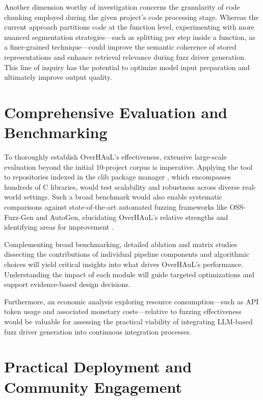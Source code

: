 \documentclass[
  a4paper,
]{scrreprt}
\theoremstyle{definition}
\theoremstyle{remark}
\begin{document}
Another dimension worthy of investigation concerns the granularity of
code chunking employed during the given project's code processing stage.
Whereas the current approach partitions code at the function level,
experimenting with more nuanced segmentation strategies---such as
splitting per step inside a function, as a finer-grained
technique---could improve the semantic coherence of stored
representations and enhance retrieval relevance during fuzz driver
generation. This line of inquiry has the potential to optimize model
input preparation and ultimately improve output quality.

\section{Comprehensive Evaluation and
Benchmarking}\label{comprehensive-evaluation-and-benchmarking}

To thoroughly establish OverHAuL's effectiveness, extensive large-scale
evaluation beyond the initial 10-project corpus is imperative. Applying
the tool to repositories indexed in the clib package manager
\autocite{clibs}, which encompasses hundreds of C libraries, would test
scalability and robustness across diverse real-world settings. Such a
broad benchmark would also enable systematic comparisons against
state-of-the-art automated fuzzing frameworks like OSS-Fuzz-Gen and
AutoGen, elucidating OverHAuL's relative strengths and identifying areas
for improvement \autocite{oss-fuzz-gen,sun2024}.

Complementing broad benchmarking, detailed ablation and matrix studies
dissecting the contributions of individual pipeline components and
algorithmic choices will yield critical insights into what drives
OverHAuL's performance. Understanding the impact of each module will
guide targeted optimizations and support evidence-based design
decisions.

Furthermore, an economic analysis exploring resource consumption---such
as API token usage and associated monetary costs---relative to fuzzing
effectiveness would be valuable for assessing the practical viability of
integrating LLM-based fuzz driver generation into continuous integration
processes.

\section{Practical Deployment and Community
Engagement}\label{practical-deployment-and-community-engagement}
\end{document}
